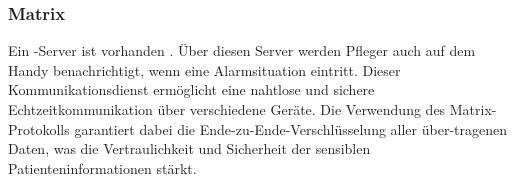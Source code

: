\subsubsection{Matrix}
Ein -Server ist vorhanden \cite{Matrix}. Über diesen Server werden Pfleger auch auf dem Handy benachrichtigt, wenn eine Alarmsituation eintritt. Dieser Kommunikationsdienst ermöglicht eine nahtlose und sichere Echtzeitkommunikation über verschiedene Geräte. Die Verwendung des Matrix-Protokolls garantiert dabei die Ende-zu-Ende-Verschlüsselung aller über-tragenen Daten, was die Vertraulichkeit und Sicherheit der sensiblen Patienteninformationen stärkt.

